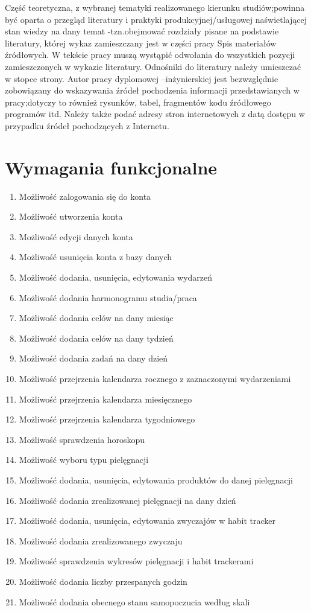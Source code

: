 \phantom{Th} Część teoretyczna, z wybranej tematyki realizowanego kierunku studiów;powinna być oparta o przegląd literatury i praktyki produkcyjnej/usługowej naświetlającej stan wiedzy na dany temat -tzn.obejmować rozdziały pisane na podstawie literatury, której wykaz zamieszczany jest w części pracy Spis materiałów źródłowych. W tekście pracy muszą wystąpić odwołania do wszystkich pozycji zamieszczonych w wykazie literatury. Odnośniki do literatury należy umieszczać w stopce strony. Autor pracy dyplomowej –inżynierskiej jest bezwzględnie zobowiązany do wskazywania źródeł pochodzenia informacji przedstawianych w pracy;dotyczy to również rysunków, tabel, fragmentów kodu źródłowego programów itd. Należy także podać adresy stron internetowych z datą dostępu w przypadku źródeł pochodzących z Internetu.

\section{Wymagania funkcjonalne}
\begin{enumerate}
  \item Możliwość zalogowania się do konta
  \item Możliwość utworzenia konta
  \item Możliwość edycji danych konta
  \item Możliwość usunięcia konta z bazy danych
  \item Możliwość dodania, usunięcia, edytowania wydarzeń
  \item Możliwość dodania harmonogramu studia/praca
  \item Możliwość dodania celów na dany miesiąc
  \item Możliwość dodania celów na dany tydzień
  \item Możliwość dodania zadań na dany dzień
  \item Możliwość przejrzenia kalendarza rocznego z zaznaczonymi wydarzeniami
  \item Możliwość przejrzenia kalendarza miesięcznego
  \item Możliwość przejrzenia kalendarza tygodniowego
  \item Możliwość sprawdzenia horoskopu
  \item Możliwość wyboru typu pielęgnacji
  \item Możliwość dodania, usunięcia, edytowania produktów do danej pielęgnacji
  \item Możliwość dodania zrealizowanej pielęgnacji na dany dzień
  \item Możliwość dodania, usunięcia, edytowania zwyczajów w habit tracker
  \item Możliwość dodania zrealizowanego zwyczaju
  \item Możliwość sprawdzenia wykresów pielęgnacji i habit trackerami
  \item Możliwość dodania liczby przespanych godzin
  \item Możliwość dodania obecnego stanu samopoczucia według skali
\end{enumerate}

